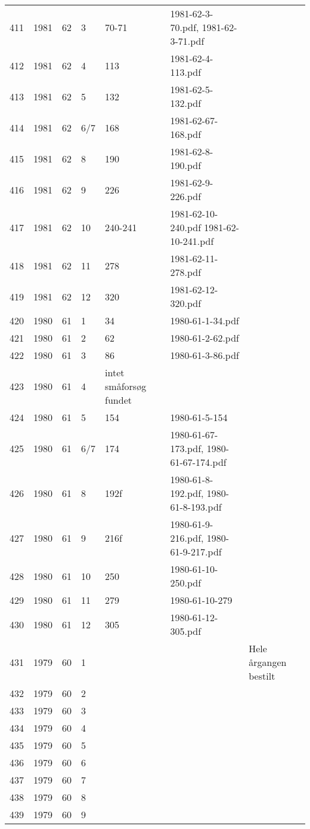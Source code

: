 \begin{longtable}{ |l|l|l|l|l|l|l| }
411 & 1981 & 62 & 3 & 70-71 & 1981-62-3-70.pdf, 1981-62-3-71.pdf &  \\
412 & 1981 & 62 & 4 & 113 & 1981-62-4-113.pdf &  \\
413 & 1981 & 62 & 5 & 132 & 1981-62-5-132.pdf &  \\
414 & 1981 & 62 & 6/7 & 168 & 1981-62-67-168.pdf &  \\
415 & 1981 & 62 & 8 & 190 & 1981-62-8-190.pdf &  \\
416 & 1981 & 62 & 9 & 226 & 1981-62-9-226.pdf &  \\
417 & 1981 & 62 & 10 & 240-241 & 1981-62-10-240.pdf 1981-62-10-241.pdf &  \\
418 & 1981 & 62 & 11 & 278 & 1981-62-11-278.pdf &  \\
419 & 1981 & 62 & 12 & 320 & 1981-62-12-320.pdf &  \\
420 & 1980 & 61 & 1 & 34 & 1980-61-1-34.pdf &  \\
421 & 1980 & 61 & 2 & 62 & 1980-61-2-62.pdf &  \\
422 & 1980 & 61 & 3 & 86 & 1980-61-3-86.pdf &  \\
423 & 1980 & 61 & 4 & intet småforsøg fundet &  &  \\
424 & 1980 & 61 & 5 & 154 & 1980-61-5-154 &  \\
425 & 1980 & 61 & 6/7 & 174 & 1980-61-67-173.pdf, 1980-61-67-174.pdf &  \\
426 & 1980 & 61 & 8 & 192f & 1980-61-8-192.pdf, 1980-61-8-193.pdf &  \\
427 & 1980 & 61 & 9 & 216f & 1980-61-9-216.pdf, 1980-61-9-217.pdf &  \\
428 & 1980 & 61 & 10 & 250 & 1980-61-10-250.pdf &  \\
429 & 1980 & 61 & 11 & 279 & 1980-61-10-279 &  \\
430 & 1980 & 61 & 12 & 305 & 1980-61-12-305.pdf &  \\
431 & 1979 & 60 & 1 &  &  & Hele årgangen bestilt \\
432 & 1979 & 60 & 2 &  &  &  \\
433 & 1979 & 60 & 3 &  &  &  \\
434 & 1979 & 60 & 4 &  &  &  \\
435 & 1979 & 60 & 5 &  &  &  \\
436 & 1979 & 60 & 6 &  &  &  \\
437 & 1979 & 60 & 7 &  &  &  \\
438 & 1979 & 60 & 8 &  &  &  \\
439 & 1979 & 60 & 9 &  &  &  \\

\end{longtable}
